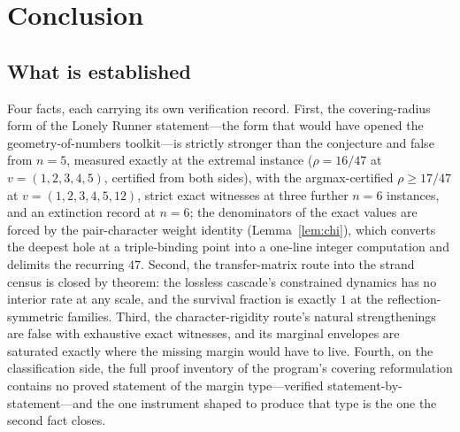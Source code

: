 
\section{Conclusion}\label{sec:concl}

\subsection{What is established}

Four facts, each carrying its own verification record. First, the
covering-radius form of the Lonely Runner statement---the form that
would have opened the geometry-of-numbers toolkit---is strictly stronger
than the conjecture and false from $n=5$, measured exactly at the
extremal instance ($\rho=16/47$ at $v=(1,2,3,4,5)$, certified from both
sides), with the argmax-certified $\rho\ge17/47$ at
$v=(1,2,3,4,5,12)$, strict exact
witnesses at three further $n=6$ instances, and an extinction record at
$n=6$; the denominators of the exact values are forced by the
pair-character weight identity (Lemma~\ref{lem:chi}), which converts
the deepest hole at a triple-binding point into a one-line integer
computation and delimits the recurring $47$. Second, the
transfer-matrix route into the strand census is
closed by theorem: the lossless cascade's constrained dynamics has no
interior rate at any scale, and the survival fraction is exactly $1$ at
the reflection-symmetric families. Third, the character-rigidity route's
natural strengthenings are false with exhaustive exact witnesses, and
its marginal envelopes are saturated exactly where the missing margin
would have to live. Fourth, on the classification side, the full proof
inventory of the program's covering reformulation contains no proved
statement of the margin type---verified statement-by-statement---and the
one instrument shaped to produce that type is the one the second fact
closes.

